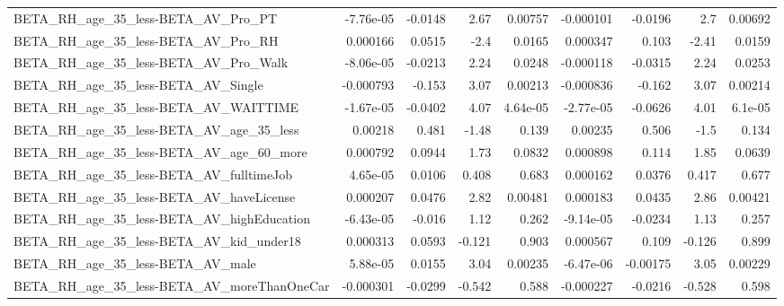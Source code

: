 \begin{tabular}{lrrrrrrrr}
BETA\_RH\_age\_35\_less-BETA\_AV\_Pro\_PT                 &   -7.76e-05 &      -0.0148 &      2.67 &  0.00757 &  -0.000101 &     -0.0196 &          2.7 &       0.00692 \\
BETA\_RH\_age\_35\_less-BETA\_AV\_Pro\_RH                 &    0.000166 &       0.0515 &      -2.4 &   0.0165 &   0.000347 &       0.103 &        -2.41 &        0.0159 \\
BETA\_RH\_age\_35\_less-BETA\_AV\_Pro\_Walk               &   -8.06e-05 &      -0.0213 &      2.24 &   0.0248 &  -0.000118 &     -0.0315 &         2.24 &        0.0253 \\
BETA\_RH\_age\_35\_less-BETA\_AV\_Single                 &   -0.000793 &       -0.153 &      3.07 &  0.00213 &  -0.000836 &      -0.162 &         3.07 &       0.00214 \\
BETA\_RH\_age\_35\_less-BETA\_AV\_WAITTIME               &   -1.67e-05 &      -0.0402 &      4.07 & 4.64e-05 &  -2.77e-05 &     -0.0626 &         4.01 &       6.1e-05 \\
BETA\_RH\_age\_35\_less-BETA\_AV\_age\_35\_less            &     0.00218 &        0.481 &     -1.48 &    0.139 &    0.00235 &       0.506 &         -1.5 &         0.134 \\
BETA\_RH\_age\_35\_less-BETA\_AV\_age\_60\_more            &    0.000792 &       0.0944 &      1.73 &   0.0832 &   0.000898 &       0.114 &         1.85 &        0.0639 \\
BETA\_RH\_age\_35\_less-BETA\_AV\_fulltimeJob            &    4.65e-05 &       0.0106 &     0.408 &    0.683 &   0.000162 &      0.0376 &        0.417 &         0.677 \\
BETA\_RH\_age\_35\_less-BETA\_AV\_haveLicense            &    0.000207 &       0.0476 &      2.82 &  0.00481 &   0.000183 &      0.0435 &         2.86 &       0.00421 \\
BETA\_RH\_age\_35\_less-BETA\_AV\_highEducation          &   -6.43e-05 &       -0.016 &      1.12 &    0.262 &  -9.14e-05 &     -0.0234 &         1.13 &         0.257 \\
BETA\_RH\_age\_35\_less-BETA\_AV\_kid\_under18            &    0.000313 &       0.0593 &    -0.121 &    0.903 &   0.000567 &       0.109 &       -0.126 &         0.899 \\
BETA\_RH\_age\_35\_less-BETA\_AV\_male                   &    5.88e-05 &       0.0155 &      3.04 &  0.00235 &  -6.47e-06 &    -0.00175 &         3.05 &       0.00229 \\
BETA\_RH\_age\_35\_less-BETA\_AV\_moreThanOneCar         &   -0.000301 &      -0.0299 &    -0.542 &    0.588 &  -0.000227 &     -0.0216 &       -0.528 &         0.598 \\

\end{tabular}
